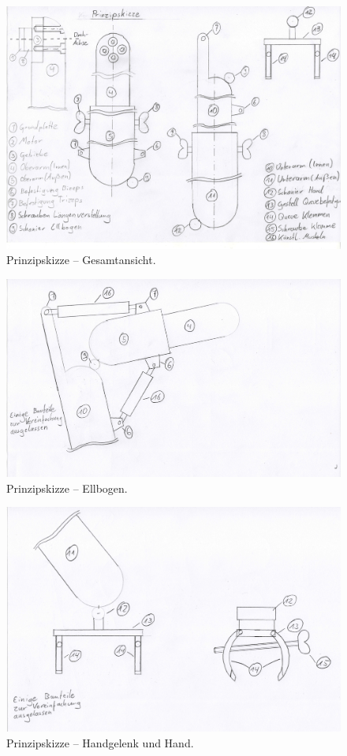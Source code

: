 	\begin{figure}[h]
		\centering
		\includegraphics[width=\textwidth]{Abb/Prinzipskizze_Gesamtansicht}
		\caption[Prinzipskizze -- Gesamtansicht]{Prinzipskizze -- Gesamtansicht.}
		\label{fig:prinzipskizze-gesamtansicht}
	\end{figure}

	\begin{figure}[h]
		\centering
		\includegraphics[width=\textwidth]{Abb/Prinzipskizze_Ellbogen}
		\caption[Prinzipskizze - Ellbogen]{Prinzipskizze -- Ellbogen.}
		\label{fig:prinzipskizze-ellbogen}
	\end{figure}

	\begin{figure}[h]
		\centering
		\includegraphics[width=\textwidth]{Abb/Prinzipskizze_Handgelenk_und_Hand}
		\caption[Prinzipskizze - Handgelenk und Hand]{Prinzipskizze -- Handgelenk und Hand.}
		\label{fig:prinzipskizze-handgelenk-und-hand}
	\end{figure}